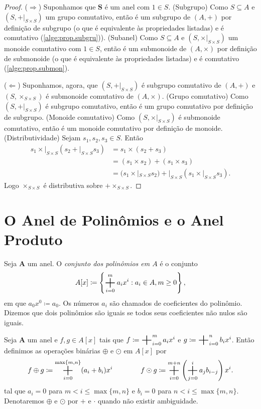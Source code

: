 \begin{proof}
($\Rightarrow$) Suponhamos que $\bm S$ é um anel com $1 \in S$.
(Subgrupo) Como $S \subseteq A$ e $(S,+|_{S \times S})$ um grupo comutativo, então é um subgrupo de $(A,+)$ por definição de subgrupo (o que é equivalente às propriedades listadas) e é comutativo (\ref{alge:prop.subgru})).
(Subanel)  Como $S \subseteq A$ e $(S,\times|_{S \times S})$ um monoide comutativo com $1 \in S$, então é um submonoide de $(A,\times)$ por definição de submonoide (o que é equivalente às propriedades listadas) e é comutativo (\ref{alge:prop.submon}).

($\Leftarrow$) Suponhamos, agora, que $(S,+|_{S \times S})$ é subgrupo comutativo de $(A,+)$ e $(S,\times_{S \times S})$ é submonoide comutativo de $(A,\times)$.
(Grupo comutativo) Como $(S,+|_{S \times S})$ é subgrupo comutativo, então é um grupo comutativo por definição de subgrupo. (Monoide comutativo) Como $(S,\times|_{S \times S})$ é submonoide comutativo, então é um monoide comutativo por definição de monoide. (Distributividade) Sejam $s_1,s_2,s_3 \in S$. Então
	\begin{align*}
	s_1 \times|_{S \times S} (s_2 +|_{S \times S} s_3) &= s_1 \times (s_2 + s_3) \\
		&= (s_1 \times s_2) + (s_1 \times s_3) \\
		&= (s_1 \times| _{S \times S} s_2) +|_{S \times S} (s_1 \times|_{S \times S} s_3).
	\end{align*}
Logo $\times_{S \times S}$ é distributiva sobre $+ \times_{S \times S}$.

\end{proof}

\section{O Anel de Polinômios e o Anel Produto}

\begin{defi}
	Seja $\bm A$ um anel. O \emph{conjunto dos polinômios em $A$} é o conjunto
	\begin{equation*}
	A[x] \coloneqq \left\{ \bigsum_{i=0}^m a_ix^i : a_i \in A, m \geq 0 \right\},
	\end{equation*}
em que $a_0x^0 \coloneqq a_0$. Os números $a_i$ são chamados de coeficientes do polinômio. Dizemos que dois polinômios são iguais se todos seus coeficientes não nulos são iguais.
\end{defi}

\begin{defi}
	 Seja $\bm A$ um anel e $f,g \in A[x]$ tais que $f \coloneqq \bigsum_{i=0}^m a_ix^i$ e $g \coloneqq \bigsum_{i=0}^n b_ix^i$. Então definimos as operações binárias $\oplus$ e $\odot$ em $A[x]$ por
	\begin{equation*}
	f \oplus g \coloneqq \bigsum_{i=0}^{\max\{m,n\}} (a_i+b_i)x^i
	\qquad \qquad f \odot g \coloneqq \bigsum_{i=0}^{m+n} \left(\bigsum_{j=0}^i a_jb_{i-j}\right)x^i.
	\end{equation*}
tal que $a_i=0$ para $m < i \leq \max\{m,n\}$ e $b_i=0$ para $n < i \leq \max\{m,n\}$. Denotaremos $\oplus$ e $\odot$ por $+$ e $\cdot$ quando não existir ambiguidade.
\end{defi}

